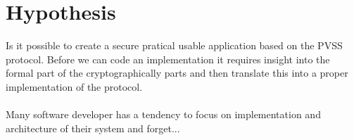\section{Hypothesis}
Is it possible to create a secure pratical usable application based on the PVSS protocol. Before we can code an implementation it requires insight into the formal part of the cryptographically parts and then translate this into a proper implementation of the protocol.\\\\
Many software developer has a tendency to focus on implementation and architecture of their system and forget... 

